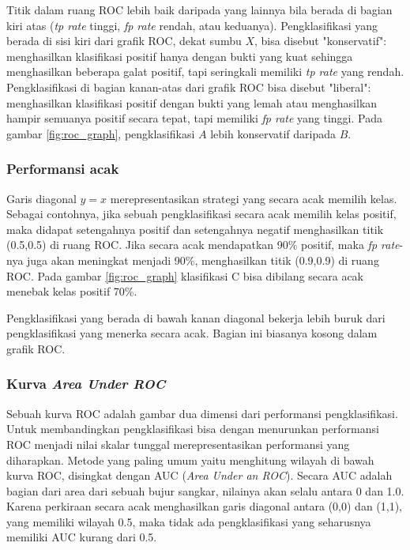 Titik dalam ruang ROC lebih baik daripada yang lainnya bila berada di bagian
kiri atas (\textit{tp rate} tinggi, \textit{fp rate} rendah, atau keduanya).
Pengklasifikasi yang berada di sisi kiri dari grafik ROC, dekat sumbu $X$, bisa
disebut "konservatif": menghasilkan klasifikasi positif hanya dengan bukti yang
kuat sehingga menghasilkan beberapa galat positif, tapi seringkali memiliki
\textit{tp rate} yang rendah.
Pengklasifikasi di bagian kanan-atas dari grafik ROC bisa disebut "liberal":
menghasilkan klasifikasi positif dengan bukti yang lemah atau menghasilkan
hampir semuanya positif secara tepat, tapi memiliki \textit{fp rate} yang
tinggi.
Pada gambar \ref{fig:roc_graph}, pengklasifikasi $A$ lebih konservatif daripada
$B$.

\subsubsection{Performansi acak}

Garis diagonal $ y = x $ merepresentasikan strategi yang secara acak memilih
kelas.
Sebagai contohnya, jika sebuah pengklasifikasi secara acak memilih kelas
positif, maka didapat setengahnya positif dan setengahnya negatif menghasilkan
titik (0.5,0.5) di ruang ROC.
Jika secara acak mendapatkan 90\% positif, maka \textit{fp rate}-nya juga akan
meningkat menjadi 90\%, menghasilkan titik (0.9,0.9) di ruang ROC.
Pada gambar \ref{fig:roc_graph} klasifikasi C bisa dibilang secara acak menebak
kelas positif 70\%.

Pengklasifikasi yang berada di bawah kanan diagonal bekerja lebih buruk dari
pengklasifikasi yang menerka secara acak.
Bagian ini biasanya kosong dalam grafik ROC.

\subsubsection{Kurva \textit{Area Under ROC}}

Sebuah kurva ROC adalah gambar dua dimensi dari performansi pengklasifikasi.
Untuk membandingkan pengklasifikasi bisa dengan menurunkan performansi ROC
menjadi nilai skalar tunggal merepresentasikan performansi yang diharapkan.
Metode yang paling umum yaitu menghitung wilayah di bawah kurva ROC, disingkat
dengan AUC (\textit{Area Under an ROC}).
Secara AUC adalah bagian dari area dari sebuah bujur sangkar, nilainya akan
selalu antara 0 dan 1.0.
Karena perkiraan secara acak menghasilkan garis diagonal antara (0,0) dan
(1,1), yang memiliki wilayah 0.5, maka tidak ada pengklasifikasi yang 
seharusnya memiliki AUC kurang dari 0.5.
